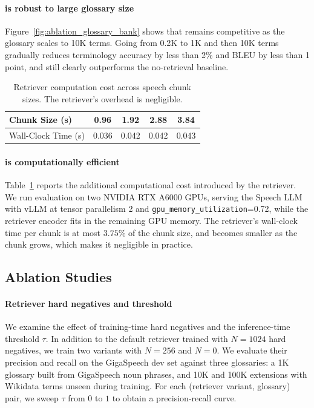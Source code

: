 \paragraph{\method is robust to large glossary size}
Figure~\ref{fig:ablation_glossary_bank} shows that \method remains competitive as the glossary scales to 10K terms. Going from 0.2K to 1K and then 10K terms gradually reduces terminology accuracy by less than 2\% and BLEU by less than 1 point, and \method still clearly outperforms the no-retrieval baseline.


\begin{table}[t]
\centering
\small
\begin{tabular}{lcccc}
\toprule
\textbf{Chunk Size (s)} & 0.96 & 1.92 & 2.88 & 3.84 \\
\midrule
Wall-Clock Time (s)    & 0.036 & 0.042 & 0.042 & 0.043 \\
\bottomrule
\end{tabular}
\caption{Retriever computation cost across speech chunk sizes. The retriever's overhead is negligible.}
\label{tab:rag_compute_rtf}
\vspace{-0.5cm}
\end{table}

\paragraph{\method is computationally efficient}
Table~\ref{tab:rag_compute_rtf} reports the additional computational cost introduced by the retriever. We run evaluation on two NVIDIA RTX A6000 GPUs, serving the Speech LLM with vLLM at tensor parallelism 2 and \texttt{gpu\_memory\_utilization}{=}0.72, while the retriever encoder fits in the remaining GPU memory. The retriever's wall-clock time per chunk is at most $3.75\%$ of the chunk size, and becomes smaller as the chunk grows, which makes it negligible in practice.

\subsection{Ablation Studies}
\label{sec:ablations}

\paragraph{Retriever hard negatives and threshold}
We examine the effect of training-time hard negatives and the inference-time threshold $\tau$. In addition to the default retriever trained with $N{=}1024$ hard negatives, we train two variants with $N{=}256$ and $N{=}0$. We evaluate their precision and recall on the GigaSpeech dev set against three glossaries: a 1K glossary built from GigaSpeech noun phrases, and 10K and 100K extensions with Wikidata terms unseen during training. For each (retriever variant, glossary) pair, we sweep $\tau$ from $0$ to $1$ to obtain a precision-recall curve. 

